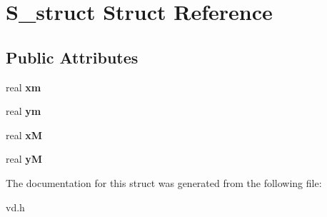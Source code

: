 \hypertarget{structS__struct}{}\section{S\+\_\+struct Struct Reference}
\label{structS__struct}
\subsection*{Public Attributes}
\begin{DoxyCompactItemize}
\item 
\mbox{\label{structS__struct_a25e8165588324b622784f0a6a192229b}} 
real {\bfseries xm}
\item 
\mbox{\label{structS__struct_a1764528f072024257fb367573b1f96b4}} 
real {\bfseries ym}
\item 
\mbox{\label{structS__struct_a403655f51cb0c6872984d84fa07212d9}} 
real {\bfseries xM}
\item 
\mbox{\label{structS__struct_adcfd9a919530aa86fd28ad1d4d3486d6}} 
real {\bfseries yM}
\end{DoxyCompactItemize}


The documentation for this struct was generated from the following file\+:\begin{DoxyCompactItemize}
\item 
vd.\+h\end{DoxyCompactItemize}
